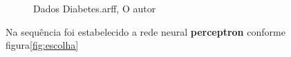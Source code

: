 \begin{figure}[H] %
  \center
  \caption{Dados Diabetes.arff, O autor}\label{fig:dados}
\end{figure}
\par Na sequência foi estabelecido a rede neural \textbf{perceptron} conforme figura\ref{fig:escolha}

